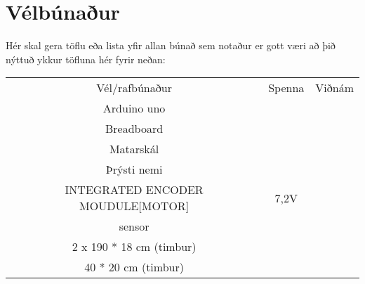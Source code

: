 \section{Vélbúnaður}
Hér skal gera töflu eða lista yfir allan búnað sem notaður er gott væri að þið nýttuð ykkur töfluna hér fyrir neðan:

\begin{center}
\begin{tabular}{ |c|c|c| } 
 \hline
 Vél/rafbúnaður &Spenna &Viðnám\\ 
 Arduino uno & &\\ 
 Breadboard & & \\ 
 Matarskál & &\\ 
 Þrýsti nemi & &\\
 INTEGRATED ENCODER MOUDULE[MOTOR] & 7,2V &\\
 sensor & &\\
 2 x 190 * 18 cm (timbur) & &\\
 40 * 20 cm (timbur) & &\\
 \hline
\end{tabular}
\end{center}